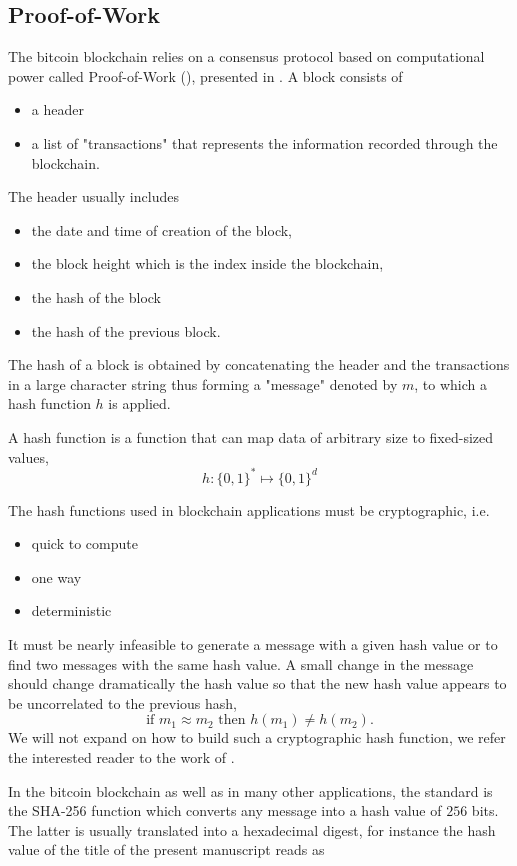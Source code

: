 \subsection{Proof-of-Work}\label{ssec:pow}
The bitcoin blockchain relies on a consensus protocol based on computational power called Proof-of-Work (\PoW), presented in \citet{Na08}. A block consists of 
\begin{itemize}
\item a header 
\item a list of "transactions" that represents the information recorded through the blockchain. 
\end{itemize}
The header usually includes 
\begin{itemize}
\item the date and time of creation of the block, 
\item the block height which is the index inside the blockchain, 
\item the hash of the block 
\item the hash of the previous block. 
\end{itemize}
The hash of a block is obtained by concatenating the header and the transactions in a large character string thus forming a "message" denoted by $m$, to which a hash function $h$ is applied. 
\begin{definition}
A hash function is a function that can map data of arbitrary size to fixed-sized values, 
$$
h:\{0,1\}^\ast\mapsto \{0,1\}^d
$$ 
\end{definition}
The hash functions used in blockchain applications must be cryptographic, i.e.\ 
\begin{itemize}
\item quick to compute 
\item one way 
\item deterministic 
\end{itemize}
\begin{remark}
It must be nearly infeasible to generate a message with a given hash value or to find two messages with the same hash value. A small change in the message should change dramatically the hash value so that the new hash value appears to be uncorrelated to the previous hash, 
$$
\text{if }m_1\approx m_2\text{ then }h(m_1)\neq h(m_2).
$$ 
We will not expand on how to build such a cryptographic hash function, we refer the interested reader to the work of \citet{cryptoeprint:2011:565}. 
\end{remark}
In the bitcoin blockchain as well as in many other applications, the standard is the SHA-256 function which converts any message into a hash value of $256$ bits. The latter is usually translated into a hexadecimal digest, for instance the hash value of the title of the present manuscript reads as 
